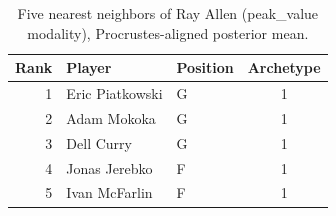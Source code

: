 \begin{table}[htbp]
  \centering\small
  \begin{tabular}{rllc}
    \toprule
    Rank & Player & Position & Archetype \\
    \midrule
    1 & Eric Piatkowski & G & 1 \\
    2 & Adam Mokoka & G & 1 \\
    3 & Dell Curry & G & 1 \\
    4 & Jonas Jerebko & F & 1 \\
    5 & Ivan McFarlin & F & 1 \\
    \bottomrule
  \end{tabular}
  \caption{Five nearest neighbors of Ray Allen (peak_value modality), Procrustes-aligned posterior mean.}
  \label{tab:Ray_Allen_neighbors_peak_value}
\end{table}

